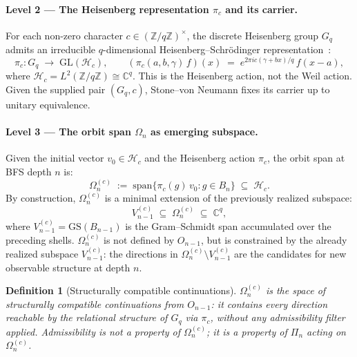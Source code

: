 \documentclass[11pt,a4paper]{article}
\newtheorem{definition}[theorem]{Definition}
\begin{document}
    \paragraph{Level 2 — The Heisenberg representation $\pi_c$ and its carrier.}
      For each non-zero character $c \in (\mathbb{Z}/q\mathbb{Z})^\times$, the
      discrete Heisenberg group $G_q$ admits an irreducible $q$-dimensional
      Heisenberg--Schr\"odinger representation~\cite{Beau2026a16}:
      \begin{equation}
        \pi_c : G_q \;\longrightarrow\; \mathrm{GL}(\mathcal{H}_c),
        \qquad
        (\pi_c(a,b,\gamma)\,f)(x) \;=\;
        e^{2\pi i c(\gamma + bx)/q}\, f(x-a),
      \end{equation}
      where $\mathcal{H}_c=L^2(\mathbb{Z}/q\mathbb{Z})\cong\mathbb{C}^q$.
      This is the Heisenberg action, not the Weil action.
      Given the supplied pair $(G_q,c)$, Stone--von Neumann fixes its carrier up
      to unitary equivalence.

    \paragraph{Level 3 — The orbit span $\Omega_n$ as emerging subspace.}
      Given the initial vector $v_0 \in \mathcal{H}_c$ and the Heisenberg action
      $\pi_c$,
      the orbit span at BFS depth $n$ is:
      \begin{equation}
        \label{eq:omega-n}
        \Omega_n^{(c)}
        \;:=\;
        \mathrm{span}\bigl\{\pi_c(g)\,v_0 : g \in B_n\bigr\}
        \;\subseteq\; \mathcal{H}_c.
      \end{equation}
      By construction, $\Omega_n^{(c)}$ is a minimal extension of the previously
      realized subspace:
      \begin{equation}
        \label{eq:omega-n-inclusion}
        V_{n-1}^{(c)} \;\subseteq\; \Omega_n^{(c)} \;\subseteq\; \mathbb{C}^q,
      \end{equation}
      where $V_{n-1}^{(c)} = \mathrm{GS}(B_{n-1})$ is the Gram--Schmidt span
      accumulated over the preceding shells.
      $\Omega_n^{(c)}$ is not defined by $O_{n-1}$, but is constrained by the
      already realized subspace $V_{n-1}^{(c)}$: the directions in
      $\Omega_n^{(c)} \setminus V_{n-1}^{(c)}$ are the candidates for new
      observable structure at depth $n$.

      \begin{definition}[Structurally compatible continuations]
        \label{def:omega-n}
        $\Omega_n^{(c)}$ is the space of \emph{structurally compatible continuations}
        from $O_{n-1}$: it contains every direction reachable by the relational
        structure of $G_q$ via $\pi_c$, without any admissibility filter applied.
        Admissibility is \emph{not} a property of $\Omega_n^{(c)}$;
        it is a property of $\Pi_n$ acting on $\Omega_n^{(c)}$.
      \end{definition}
\end{document}
